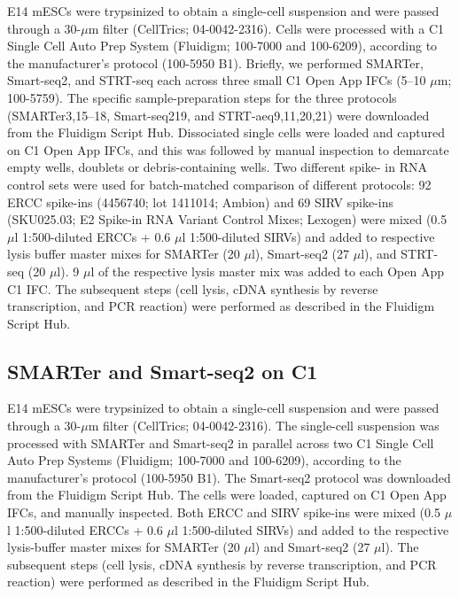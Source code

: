 \begin{sloppypar}
E14 mESCs were trypsinized to obtain a single-cell suspension and were passed through a 30-\( \mu \)m filter (CellTrics; 04-0042-2316). Cells were processed with a C1 Single Cell Auto Prep System (Fluidigm; 100-7000 and 100-6209), according to the manufacturer’s protocol (100-5950 B1). Briefly, we performed SMARTer, Smart-seq2, and STRT-seq each across three small C1 Open App IFCs (5–10 \( \mu \)m; 100-5759). The specific sample-preparation steps for the three protocols (SMARTer3,15–18, Smart-seq219, and STRT-aeq9,11,20,21) were downloaded from the Fluidigm Script Hub. Dissociated single cells were loaded and captured on C1 Open App IFCs, and this was followed by manual inspection to demarcate empty wells, doublets or debris-containing wells. Two different spike- in RNA control sets were used for batch-matched comparison of different protocols: 92 ERCC spike-ins (4456740; lot 1411014; Ambion) and 69 SIRV spike-ins (SKU025.03; E2 Spike-in RNA Variant Control Mixes; Lexogen) were mixed (0.5 \( \mu \)l 1:500-diluted ERCCs + 0.6 \( \mu \)l 1:500-diluted SIRVs) and added to respective lysis buffer master mixes for SMARTer (20 \( \mu \)l), Smart-seq2 (27 \( \mu \)l), and STRT-seq (20 \( \mu \)l). 9 \( \mu \)l of the respective lysis master mix was added to each Open App C1 IFC. The subsequent steps (cell lysis, cDNA synthesis by reverse transcription, and PCR reaction) were performed as described in the Fluidigm Script Hub.
\end{sloppypar}

\subsection{SMARTer and Smart-seq2 on C1}

E14 mESCs were trypsinized to obtain a single-cell suspension and were passed through a 30-\( \mu \)m filter (CellTrics; 04-0042-2316). The single-cell suspension was processed with SMARTer and Smart-seq2 in parallel across two C1 Single Cell Auto Prep Systems (Fluidigm; 100-7000 and 100-6209), according to the manufacturer’s protocol (100-5950 B1). The Smart-seq2 protocol was downloaded from the Fluidigm Script Hub. The cells were loaded, captured on C1 Open App IFCs, and manually inspected. Both ERCC and SIRV spike-ins were mixed (0.5 \( \mu \)l 1:500-diluted ERCCs + 0.6 \( \mu \)l 1:500-diluted SIRVs) and added to the respective lysis-buffer master mixes for SMARTer (20 \( \mu \)l) and Smart-seq2 (27 \( \mu \)l). The subsequent steps (cell lysis, cDNA synthesis by reverse transcription, and PCR reaction) were performed as described in the Fluidigm Script Hub.

